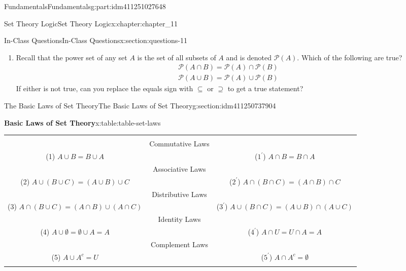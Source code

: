\documentclass[oneside,10pt,]{book}
\newcommand{\tabularfont}{\relax}
\numberwithin{equation}{section}
\newcommand{\hrulethin}  {\noalign{\hrule height 0.04em}}
\begin{document}
\begin{partptx}{Fundamentals}{}{Fundamentals}{}{}{g:part:idm411251027648}
\begin{chapterptx}{Set Theory Logic}{}{Set Theory Logic}{}{}{x:chapter:chapter_11}
\begin{sectionptx}{In-Class Questions}{}{In-Class Questions}{}{}{x:section:questions-11}
\begin{enumerate}[label=\arabic*.]
\begin{enumerate}[label=(\alph*)]
\begin{equation*}
(A \cup B \cup C)\cap ((A^c \cap B^c)\cup (A^c \cap C^c)\cup (B^c \cap C^c))
\end{equation*}
is the set of all elements that belong to exactly one of the three sets.  Verify this fact first with the example in the previous part, where you assume that the universe is \(\{1,2,3,\dots,18,19\}\).%
\item{}Find a similar expression for the set of elements that belong to exactly one of any four sets \(A, B, C, D.\)%
\end{enumerate}
%
\item{}Recall that the power set of any set \(A\) is the set of all subsets of \(A\) and is denoted \(\mathcal{P}(A)\).  Which of the following are true?%
\begin{gather*}
\mathcal{P}(A \cap B) = \mathcal{P}(A) \cap \mathcal{P}(B)\\
\mathcal{P}(A \cup B) = \mathcal{P}(A) \cup \mathcal{P}(B)
\end{gather*}
If either is not true, can you replace the equals sign with \(\subseteq\) or \(\supseteq\) to get a true statement?%
\end{enumerate}
%
\end{sectionptx}
%
%
\typeout{************************************************}
\typeout{************************************************}
%
\begin{sectionptx}{The Basic Laws of Set Theory}{}{The Basic Laws of Set Theory}{}{}{g:section:idm411250737904}
\begin{tableptx}{\textbf{Basic Laws of Set Theory}}{x:table:table-set-laws}{}%
\centering
{\tabularfont%
\begin{tabular}{ccc}
&&\tabularnewline[0pt]
&Commutative Laws&\tabularnewline[0pt]
(1) \(A \cup B = B \cup  A\)&&(\(1^{\prime}\)) \(A \cap B = B\cap A\)\tabularnewline\hrulethin
&Associative Laws&\tabularnewline[0pt]
(2) \(A \cup  (B \cup  C)= (A\cup B)\cup C\)&&(\(2^{\prime}\)) \(A \cap  (B \cap  C) = (A \cap  B) \cap  C \)\tabularnewline\hrulethin
&Distributive Laws&\tabularnewline[0pt]
(3) \(A\cap (B \cup  C)=(A\cap B )\cup (A\cap  C)\)&&(\(3^{\prime}\)) \(A \cup (B \cap C) = (A \cup B ) \cap (A\cup C)\)\tabularnewline\hrulethin
&Identity Laws&\tabularnewline[0pt]
(4) \(A \cup  \emptyset  = \emptyset  \cup  A = A\)&&(\(4^{\prime}\)) \(A \cap  U = U \cap  A = A\)\tabularnewline\hrulethin
&Complement Laws&\tabularnewline[0pt]
(5) \(A\cup A^c= U\)&&(\(5^{\prime}\)) \(A\cap A^c= \emptyset\)\tabularnewline\hrulethin

\end{tabular}}
\end{tableptx}
\end{sectionptx}
\end{chapterptx}
\end{partptx}
\end{document}
